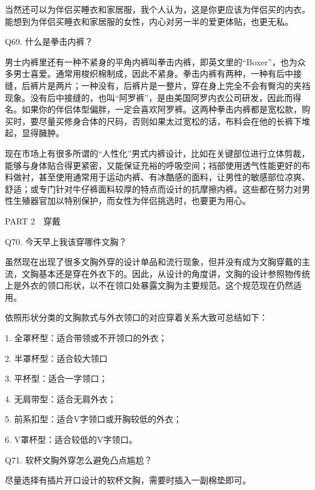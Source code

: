 \documentclass[12pt,UTF8]{ctexbook}
\begin{document}
当然还可以为伴侣买睡衣和家居服，我个人认为，这是你更应该为伴侣买的内衣。能想到为伴侣买睡衣和家居服的女性，内心对另一半的爱更体贴，也更无私。





Q69. 什么是拳击内裤？


男士内裤里还有一种不紧身的平角内裤叫拳击内裤，即英文里的“Boxer”，也为众多男士喜爱。通常用梭织棉制成，因此不紧身。拳击内裤有两种，一种有后中接缝，后裤片是两片；一种没有，后裤片是一整片，穿在身上完全不会有臀沟的夹裆现象。没有后中接缝的，也叫“阿罗裤”，是由美国阿罗内衣公司研发，因此而得名。如果你的伴侣体型偏胖，一定会喜欢阿罗裤。这两种拳击内裤都是宽松款，购买时，要尽量买修身合体的尺码，否则如果太过宽松的话，布料会在他的长裤下堆起，显得臃肿。

现在市场上有很多所谓的“人性化”男式内裤设计，比如在关键部位进行立体剪裁，能够与身体贴合得更紧密，又能保证充裕的呼吸空间；裆部使用透气性能更好的布料做衬，甚至使用通常用于运动内裤、有冰酷感的面料，让男性的敏感部位凉爽、舒适；或专门针对牛仔裤面料较厚的特点而设计的抗摩擦内裤。这些都在努力对男性生殖器官加以特别保护，而女性为伴侣挑选时，也要更为用心。





PART 2　穿戴





Q70. 今天早上我该穿哪件文胸？


虽然现在出现了很多文胸外穿的设计单品和流行现象，但并没有成为文胸穿戴的主流，文胸基本还是穿在外衣下的。因此，从设计的角度讲，文胸的设计参照物传统上是外衣的领口形状，以不在领口处暴露文胸为主要规范。这个规范现在仍然适用。

依照形状分类的文胸款式与外衣领口的对应穿着关系大致可总结如下：

1. 全罩杯型：适合带领或不开领口的外衣；

2. 半罩杯型：适合较大领口



3. 平杯型：适合一字领口；

4. 无肩带型：适合无肩外衣；

5. 前系扣型：适合V字领口或开胸较低的外衣；

6. V罩杯型：适合较低的V字领口。





Q71. 软杯文胸外穿怎么避免凸点尴尬？


尽量选择有插片开口设计的软杯文胸，需要时插入一副棉垫即可。
\end{document}
